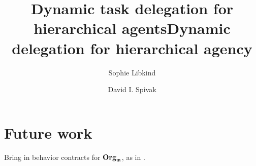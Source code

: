 \documentclass[11pt, one side, article]{memoir}
\begin{document}
\title{Dynamic task delegation for hierarchical agents}
\title{Dynamic delegation for hierarchical agency}

\author{
	Sophie Libkind\and
	David I. Spivak
}


\maketitle

\begin{abstract}

\end{abstract}








\chapter{Future work}

Bring in behavior contracts for $\mathbf{Org}_{\mathfrak{m}}$, as in \cite{schultz2016dynamical,spivak2021learners}.

\printbibliography
\end{document}
